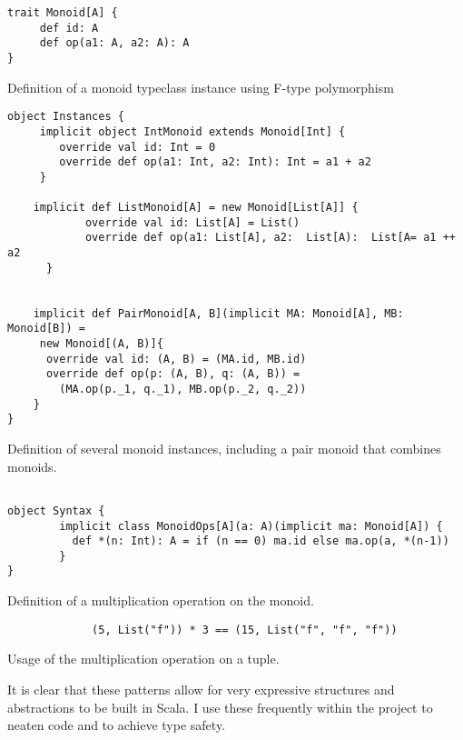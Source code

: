 \documentclass[12pt,a4paper,twoside,openright]{report}
\begin{document}
\begin{framed}
	\begin{framed}
		\begin{verbatim}
trait Monoid[A] {
     def id: A
     def op(a1: A, a2: A): A
}
		\end{verbatim}
	\end{framed}
	
	Definition of a monoid typeclass instance using F-type polymorphism
	
	\begin{framed}
		\begin{verbatim}
object Instances {
     implicit object IntMonoid extends Monoid[Int] {
        override val id: Int = 0
        override def op(a1: Int, a2: Int): Int = a1 + a2
     }

    implicit def ListMonoid[A] = new Monoid[List[A]] {
            override val id: List[A] = List()
            override def op(a1: List[A], a2:  List[A):  List[A= a1 ++ a2
      }
 

    implicit def PairMonoid[A, B](implicit MA: Monoid[A], MB: Monoid[B]) =
     new Monoid[(A, B)]{
      override val id: (A, B) = (MA.id, MB.id)
      override def op(p: (A, B), q: (A, B)) =
      	(MA.op(p._1, q._1), MB.op(p._2, q._2))
    }
}
		\end{verbatim}
	\end{framed}
	
	Definition of several monoid instances, including a pair monoid that combines monoids.
	
	\begin{framed}
		\begin{verbatim}
		
object Syntax {
        implicit class MonoidOps[A](a: A)(implicit ma: Monoid[A]) {
          def *(n: Int): A = if (n == 0) ma.id else ma.op(a, *(n-1))
        }
}
		\end{verbatim}
	\end{framed}
Definition of a multiplication operation on the monoid.
	\begin{framed}
		\begin{verbatim}
			 (5, List("f")) * 3 == (15, List("f", "f", "f"))
		\end{verbatim}
	\end{framed}
Usage of the multiplication operation on a tuple.
\end{framed}

It is clear that these patterns allow for very expressive structures and abstractions to be built in Scala. I use these frequently within the project to neaten code and to achieve type safety.
\end{document}

